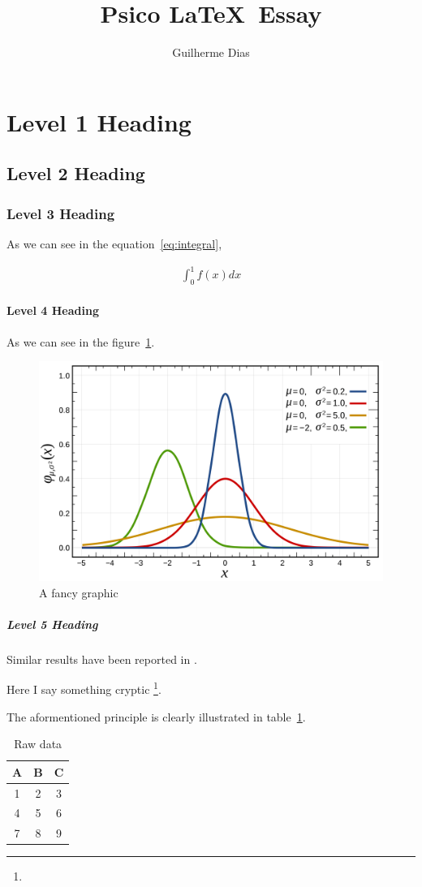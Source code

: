 \documentclass{psico-latex-essay}
\author{Guilherme Dias}
\title{Psico \LaTeX\ Essay}
\begin{document}
\maketitle

\lipsum[1-1][1-5]

\section{Level 1 Heading}
\lipsum[1-1][1-5]

\subsection{Level 2 Heading}
\lipsum[1-1][1-5]

\subsubsection{Level 3 Heading}
\lipsum[1-1][1-5]
As we can see in the equation~\ref{eq:integral},

\begin{align}
  \int_{0}^{1} f(x) dx
  \label{eq:integral}
\end{align}

\paragraph{Level 4 Heading}
\lipsum[1-1][1-5]
As we can see in the figure~\ref{fg:graphic}.

\begin{figure}[ht]
  \centering
  \includegraphics[width = 0.5 \textwidth]{graphic.png}
  \caption{A fancy graphic}
  \label{fg:graphic}
\end{figure}

\subparagraph{Level 5 Heading}
\lipsum[1-1][1-10]
Similar results have been reported in \cite{Kowalski2002}.

\lipsum[1-1][1-5]
Here I say something cryptic \footnote{\lipsum[1-1][1-5]}.

\lipsum[1-1][1-5]
The aformentioned principle is clearly illustrated in table~\ref{tb:raw_data}.

\begin{table}[ht]
  \centering
  \begin{tabular}{ccc}
    A & B & C \\
    \hline
    1 & 2 & 3 \\
    4 & 5 & 6 \\
    7 & 8 & 9 \\
  \end{tabular}
  \caption{Raw data}
  \label{tb:raw_data}
\end{table}

\lipsum[1-1][1-15]


\end{document}
